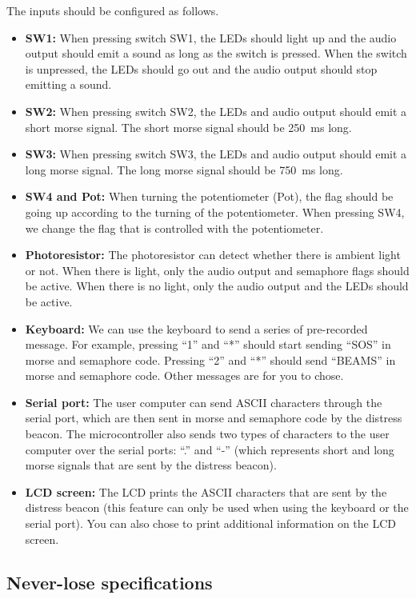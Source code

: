 The inputs should be configured as follows. 
\begin{itemize}
	\item \textbf{SW1:} When pressing switch SW1, the LEDs should light up and the audio output should emit a sound as long as the switch is pressed. When the switch is unpressed, the LEDs should go out and the audio output should stop emitting a sound. 
	\item \textbf{SW2:} When pressing switch SW2, the LEDs and audio output should emit a short morse signal. The short morse signal should be 250~ms long. 
	\item \textbf{SW3: } When pressing switch SW3, the LEDs and audio output should emit a long morse signal. The long morse signal should be 750~ms long. 
	\item \textbf{SW4 and Pot: } When turning the potentiometer (Pot), the flag should be going up according to the turning of the potentiometer. When pressing SW4, we change the flag that is controlled with the potentiometer. 
	\item \textbf{Photoresistor: } The photoresistor can detect whether there is ambient light or not. When there is light, only the audio output and semaphore flags should be active. When there is no light, only the audio output and the LEDs should be active. 
	\item \textbf{Keyboard: } We can use the keyboard to send a series of pre-recorded message. For example, pressing ``1'' and ``*'' should start sending ``SOS'' in morse and semaphore code. Pressing ``2'' and ``*'' should send ``BEAMS'' in morse and semaphore code. Other messages are for you to chose. 
	\item \textbf{Serial port: } The user computer can send ASCII characters through the serial port, which are then sent in morse and semaphore code by the distress beacon. The microcontroller also sends two types of characters to the user computer over the serial ports: ``.'' and ``-'' (which represents short and long morse signals that are sent by the distress beacon). 
	\item \textbf{LCD screen: } The LCD prints the ASCII characters that are sent by the distress beacon (this feature can only be used when using the keyboard or the serial port). You can also chose to print additional information on the LCD screen. 
\end{itemize}




\subsection{Never-lose specifications}

